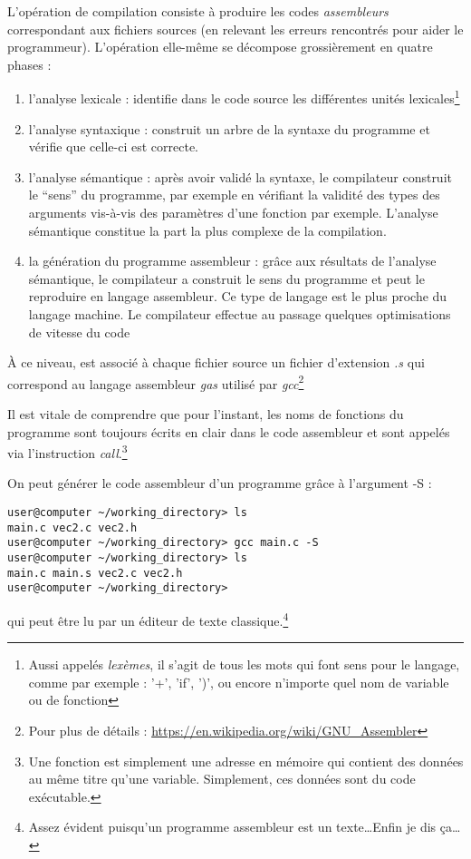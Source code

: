 \documentclass[../../../main.tex]{subfiles}
\begin{document}
L'opération de compilation consiste à produire les codes \textit{assembleurs} correspondant aux fichiers sources (en relevant les erreurs rencontrés pour aider le programmeur). L'opération elle-même se décompose grossièrement en quatre phases :
\begin{enumerate}
	\item l'analyse lexicale : identifie dans le code source les différentes unités lexicales\footnote{Aussi appelés \textit{lexèmes}, il s'agit de tous les mots qui font sens pour le langage, comme par exemple : '+', 'if', ')', ou encore n'importe quel nom de variable ou de fonction}
	\item l'analyse syntaxique : construit un arbre de la syntaxe du programme et vérifie que celle-ci est correcte.
	\item l'analyse sémantique : après avoir validé la syntaxe, le compilateur construit le ``sens'' du programme, par exemple en vérifiant la validité des types des arguments vis-à-vis des paramètres d'une fonction par exemple. L'analyse sémantique constitue la part la plus complexe de la compilation.
	\item la génération du programme assembleur : grâce aux résultats de l'analyse sémantique, le compilateur a construit le sens du programme et peut le reproduire en langage assembleur. Ce type de langage est le plus proche du langage machine. Le compilateur effectue au passage quelques optimisations de vitesse du code
\end{enumerate}
À ce niveau, est associé à chaque fichier source un fichier d'extension \textit{.s} qui correspond au langage assembleur \textit{gas} utilisé par \textit{gcc}\footnote{Pour plus de détails : \url{https://en.wikipedia.org/wiki/GNU_Assembler}}
 
Il est vitale de comprendre que pour l'instant, les noms de fonctions du programme sont toujours écrits en clair dans le code assembleur et sont appelés via l'instruction \textit{call}.\footnote{Une fonction est simplement une adresse en mémoire qui contient des données au même titre qu'une variable. Simplement, ces données sont du code exécutable.}
 
On peut générer le code assembleur d'un programme grâce à l'argument \textsf{-S} :
\begin{verbatim}
user@computer ~/working_directory> ls
main.c vec2.c vec2.h
user@computer ~/working_directory> gcc main.c -S
user@computer ~/working_directory> ls
main.c main.s vec2.c vec2.h
user@computer ~/working_directory>
\end{verbatim}
qui peut être lu par un éditeur de texte classique.\footnote{Assez évident puisqu'un programme assembleur est un texte\dots Enfin je dis ça\dots}
\end{document}

